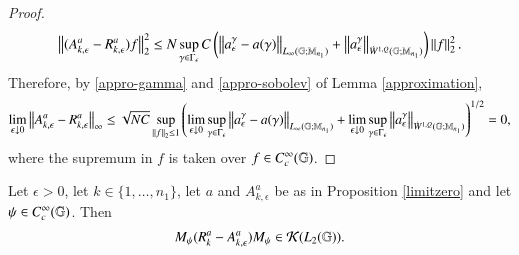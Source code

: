 \documentclass[leqno]{amsart}
\begin{document}
\begin{proof}
		$$\left\lVert(A^a_{k,\epsilon}-R^a_{k,\epsilon})f\right\rVert_2^2\leq N\sup_{\gamma\in\Gamma_\epsilon}C\left(\left\lVert a^\gamma_\epsilon-a(\gamma)\right\rVert_{L_{\infty}(\mathbb{G};\mathbb{M}_{n_1})}+\left\lVert a^\gamma_\epsilon\right\rVert_{\dot{W}^{1,Q}(\mathbb{G};\mathbb{M}_{n_{1}})}\right)\left\lVert f\right\rVert_2^2.$$
		Therefore, by \eqref{appro-gamma} and \eqref{appro-sobolev} of Lemma \ref{approximation},
		\begin{align*}
			\lim_{\epsilon\downarrow 0} \left\lVert A^a_{k,\epsilon}-R^a_{k,\epsilon}\right\rVert_\infty\leq \sqrt{NC} \sup_{\left\lVert f\right\rVert_2\leq 1}\left(\lim_{\epsilon\downarrow 0} \sup_{\gamma\in\Gamma_\epsilon}\left\lVert a^\gamma_\epsilon-a(\gamma)\right\rVert_{L_{\infty}(\mathbb{G};\mathbb{M}_{n_1})}+\lim_{\epsilon\downarrow 0} \sup_{\gamma\in\Gamma_\epsilon}\left\lVert a^\gamma_\epsilon\right\rVert_{\dot{W}^{1,Q}(\mathbb{G};\mathbb{M}_{n_{1}})}\right)^{1/2}=0,
		\end{align*}
		where the supremum in $f$ is taken over $f\in C_c^\infty(\mathbb{G})$.
	\end{proof}
	

	
	
	
	
	\begin{proposition}\label{compactAk}
		Let $\epsilon>0$, let $k\in\{1, \hdots, n_1\}$, let $a$ and $A^{a}_{k,\epsilon}$ be as in Proposition \ref{limitzero} and let $\psi\in C_{c}^{\infty}(\mathbb{G})$. Then
		\begin{align*}
			M_{\psi}({ R}^{a}_{k}-A^{a}_{k,\epsilon})M_{\psi}\in{\mathcal K}(L_{2}(\mathbb{G})).
		\end{align*}
	\end{proposition}
	
\end{document}
